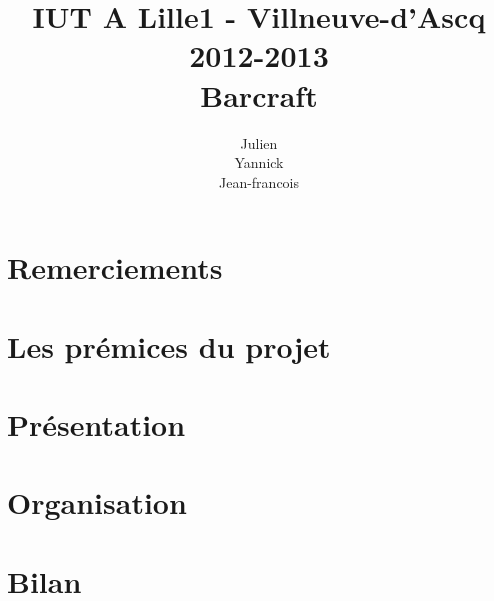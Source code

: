 \documentclass[12pt,a4paper]{report}
\title
{
	\normalsize{IUT A Lille1 - Villneuve-d'Ascq\\
	2012-2013}\\
	\vspace{15mm}
  \Huge{Barcraft
    \vspace{15mm}}
}
\author{
\bsc{Stechele} Julien\\
\bsc{Vanuxem} Yannick\\
\bsc{Serir} Jean-francois\\
	\vspace{30mm}
}
\begin{document}

\maketitle
\tableofcontents
\newpage

\section{Remerciements}%
\label{sec:remerciements}




\section{Les prémices du projet}%
\label{sec:les_premices_du_projet}

  


\section{Présentation}%
\label{sec:presentation}

  


\section{Organisation}%
\label{sec:organisation}

  


\section{Bilan}%
\label{sec:bilan}

  


\appendix

\end{document}
